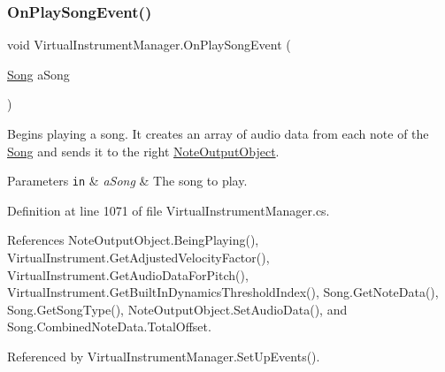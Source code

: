 \mbox{\label{group___v_i_m_handlers_ga7fd877a7d429403abbfd2728aa63c056}} 
\subsubsection{\texorpdfstring{On\+Play\+Song\+Event()}{OnPlaySongEvent()}}
{\footnotesize\ttfamily void Virtual\+Instrument\+Manager.\+On\+Play\+Song\+Event (\begin{DoxyParamCaption}\item[{\hyperlink{class_song}{Song}}]{a\+Song }\end{DoxyParamCaption})}



Begins playing a song. It creates an array of audio data from each note of the \hyperlink{class_song}{Song} and sends it to the right \hyperlink{class_note_output_object}{Note\+Output\+Object}. 


\begin{DoxyParams}[1]{Parameters}
\mbox{\tt in}  & {\em a\+Song} & The song to play. \\
\hline
\end{DoxyParams}


Definition at line 1071 of file Virtual\+Instrument\+Manager.\+cs.



References Note\+Output\+Object.\+Being\+Playing(), Virtual\+Instrument.\+Get\+Adjusted\+Velocity\+Factor(), Virtual\+Instrument.\+Get\+Audio\+Data\+For\+Pitch(), Virtual\+Instrument.\+Get\+Built\+In\+Dynamics\+Threshold\+Index(), Song.\+Get\+Note\+Data(), Song.\+Get\+Song\+Type(), Note\+Output\+Object.\+Set\+Audio\+Data(), and Song.\+Combined\+Note\+Data.\+Total\+Offset.



Referenced by Virtual\+Instrument\+Manager.\+Set\+Up\+Events().


